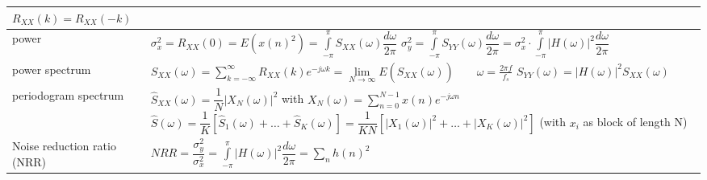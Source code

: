 \begin{tabularx}{\linewidth}{|l|X|}
	$R_{XX}(k) = R_{XX}(-k)$
	\\ \hline
  power &
  $\sigma_x^2 = R_{XX}(0) = E(x(n)^2) = \int\limits_{-\pi}^\pi S_{XX}(\omega)\dfrac{d\omega}{2\pi}$ \newline
  $\sigma_y^2 = \int\limits_{-\pi}^\pi S_{YY}(\omega)\dfrac{d\omega}{2\pi} = 
  \sigma_x^2 \cdot \int\limits_{-\pi}^\pi |H(\omega)|^2 \dfrac{d\omega}{2\pi}$
	\\ \hline
	power spectrum & 
	$S_{XX}(\omega) = \sum\limits_{k=-\infty}^{\infty} R_{XX}(k)e^{-j\omega k} = \lim\limits_{N \rightarrow \infty}
	E(\hat{S}_{XX}(\omega))
  \qquad \omega = \frac{2\pi f}{f_s} $ \newline
  $S_{YY}(\omega) = |H(\omega)|^2 S_{XX}(\omega)$
	\\ \hline
  periodogram spectrum & $\hat{S}_{XX}(\omega)=\dfrac{1}{N}|X_N(\omega)|^2$ \qquad with
  $X_N(\omega) = \sum\limits_{n=0}^{N-1}x(n)e^{-j\omega n} $ \newline
  $\hat{S}(\omega) = \dfrac{1}{K}[\hat{S}_1(\omega) + \ldots + \hat{S}_K(\omega)] = 
  \dfrac{1}{KN}[|X_1(\omega)|^2 + \ldots + |X_K(\omega)|^2]$ \newline (with $x_i$ as block of length N)
	\\ \hline	
	Noise reduction ratio (NRR) &
	$NRR = \dfrac{\sigma_y^2}{\sigma_x^2} = \int\limits_{-\pi}^\pi |H(\omega)|^2 \dfrac{d\omega}{2\pi}
	= \sum\limits_{n} h(n)^2$
	\\ \hline
\end{tabularx}